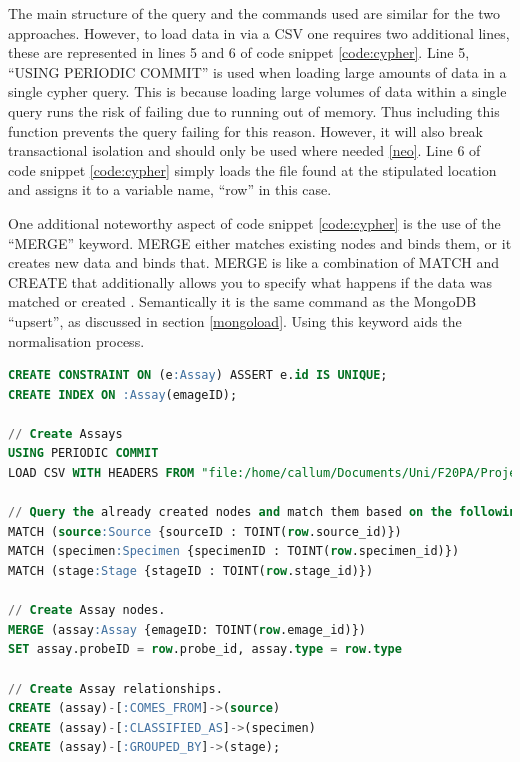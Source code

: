 The main structure of the query and the commands used are similar for the two approaches. However, to load data in via a CSV one requires two additional lines, these are represented in lines 5 and 6 of code snippet \ref{code:cypher}. Line 5, ``USING PERIODIC COMMIT'' is used when loading large amounts of data in a single cypher query. This is because loading large volumes of data within a single query runs the risk of failing due to running out of memory. Thus including this function prevents the query failing for this reason. However, it will also break transactional isolation and should only be used where needed \ref{neo}. Line 6 of code snippet \ref{code:cypher} simply loads the file found at the stipulated location and assigns it to a variable name, ``row'' in this case.

One additional noteworthy aspect of code snippet \ref{code:cypher} is the use of the ``MERGE'' keyword. MERGE either matches existing nodes and binds them, or it creates new data and binds that. MERGE is like a combination of MATCH and CREATE that additionally allows you to specify what happens if the data was matched or created \cite{nd}. Semantically it is the same command as the MongoDB ``upsert'', as discussed in section \ref{mongoload}. Using this keyword aids the normalisation process.
\newpage
\vspace*{\fill}
\begin{lstlisting}[language=SQL, caption=Cypher file created to load assay data into the Neo4j data model., label=code:cypher]
CREATE CONSTRAINT ON (e:Assay) ASSERT e.id IS UNIQUE;
CREATE INDEX ON :Assay(emageID);

// Create Assays
USING PERIODIC COMMIT
LOAD CSV WITH HEADERS FROM "file:/home/callum/Documents/Uni/F20PA/Project/Neo4j/Data/Assays.csv" AS row

// Query the already created nodes and match them based on the following clauses.
MATCH (source:Source {sourceID : TOINT(row.source_id)})
MATCH (specimen:Specimen {specimenID : TOINT(row.specimen_id)})
MATCH (stage:Stage {stageID : TOINT(row.stage_id)})

// Create Assay nodes.
MERGE (assay:Assay {emageID: TOINT(row.emage_id)})
SET assay.probeID = row.probe_id, assay.type = row.type

// Create Assay relationships.
CREATE (assay)-[:COMES_FROM]->(source)
CREATE (assay)-[:CLASSIFIED_AS]->(specimen)
CREATE (assay)-[:GROUPED_BY]->(stage);
\end{lstlisting}
\vspace*{\fill}
\newpage

